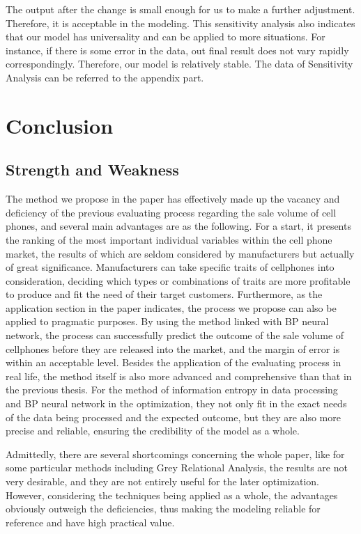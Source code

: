 The output after the change is small enough for us to make a further adjustment. Therefore, it is acceptable in the modeling. This sensitivity analysis also indicates that our model has universality and can be applied to more situations. For instance, if there is some error in the data, out final result does not vary rapidly correspondingly. Therefore, our model is relatively stable. The data of Sensitivity Analysis can be referred to the appendix part. 

\section{Conclusion}
\subsection{Strength and Weakness}

The method we propose in the paper has effectively made up the vacancy and deficiency of the previous evaluating process regarding the sale volume of cell phones, and several main advantages are as the following. For a start, it presents the ranking of the most important individual variables within the cell phone market, the results of which are seldom considered by manufacturers but actually of great significance. Manufacturers can take specific traits of cellphones into consideration, deciding which types or combinations of traits are more profitable to produce and fit the need of their target customers. Furthermore, as the application section in the paper indicates, the process we propose can also be applied to pragmatic purposes. By using the method linked with BP neural network, the process can successfully predict the outcome of the sale volume of cellphones before they are released into the market, and the margin of error is within an acceptable level. Besides the application of the evaluating process in real life, the method itself is also more advanced and comprehensive than that in the previous thesis. For the method of information entropy in data processing and BP neural network in the optimization, they not only fit in the exact needs of the data being processed and the expected outcome, but they are also more precise and reliable, ensuring the credibility of the model as a whole.

Admittedly, there are several shortcomings concerning the whole paper, like for some particular methods including Grey Relational Analysis, the results are not very desirable, and they are not entirely useful for the later optimization. However, considering the techniques being applied as a whole, the advantages obviously outweigh the deficiencies, thus making the modeling reliable for reference and have high practical value.

